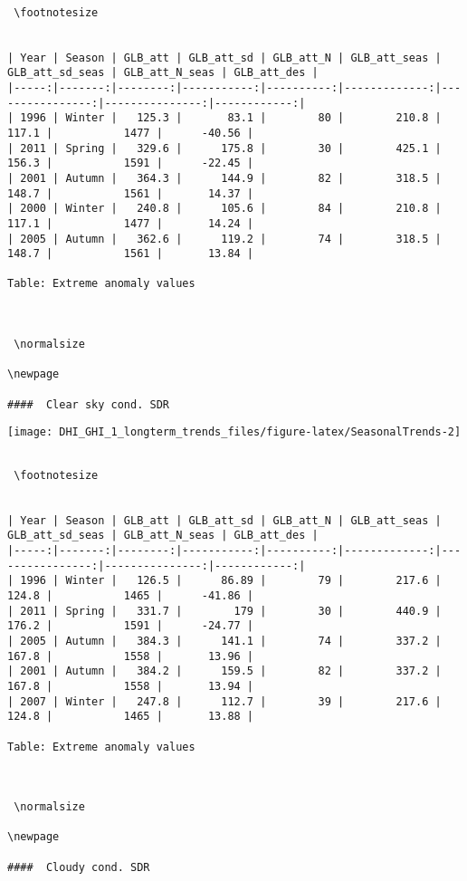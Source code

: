 \documentclass[
  10pt,
  a4paper,oneside]{article}
\begin{document}
\begin{verbatim}
 
 \footnotesize 
 

| Year | Season | GLB_att | GLB_att_sd | GLB_att_N | GLB_att_seas | GLB_att_sd_seas | GLB_att_N_seas | GLB_att_des |
|-----:|-------:|--------:|-----------:|----------:|-------------:|----------------:|---------------:|------------:|
| 1996 | Winter |   125.3 |       83.1 |        80 |        210.8 |           117.1 |           1477 |      -40.56 |
| 2011 | Spring |   329.6 |      175.8 |        30 |        425.1 |           156.3 |           1591 |      -22.45 |
| 2001 | Autumn |   364.3 |      144.9 |        82 |        318.5 |           148.7 |           1561 |       14.37 |
| 2000 | Winter |   240.8 |      105.6 |        84 |        210.8 |           117.1 |           1477 |       14.24 |
| 2005 | Autumn |   362.6 |      119.2 |        74 |        318.5 |           148.7 |           1561 |       13.84 |

Table: Extreme anomaly values


 
 \normalsize 
 
\newpage

####  Clear sky cond. SDR 
\end{verbatim}

\begin{center}\texttt{[image: DHI\_GHI\_1\_longterm\_trends\_files/figure-latex/SeasonalTrends-2]} \end{center}

\begin{verbatim}
 
 \footnotesize 
 

| Year | Season | GLB_att | GLB_att_sd | GLB_att_N | GLB_att_seas | GLB_att_sd_seas | GLB_att_N_seas | GLB_att_des |
|-----:|-------:|--------:|-----------:|----------:|-------------:|----------------:|---------------:|------------:|
| 1996 | Winter |   126.5 |      86.89 |        79 |        217.6 |           124.8 |           1465 |      -41.86 |
| 2011 | Spring |   331.7 |        179 |        30 |        440.9 |           176.2 |           1591 |      -24.77 |
| 2005 | Autumn |   384.3 |      141.1 |        74 |        337.2 |           167.8 |           1558 |       13.96 |
| 2001 | Autumn |   384.2 |      159.5 |        82 |        337.2 |           167.8 |           1558 |       13.94 |
| 2007 | Winter |   247.8 |      112.7 |        39 |        217.6 |           124.8 |           1465 |       13.88 |

Table: Extreme anomaly values


 
 \normalsize 
 
\newpage

####  Cloudy cond. SDR 
\end{verbatim}
\end{document}
